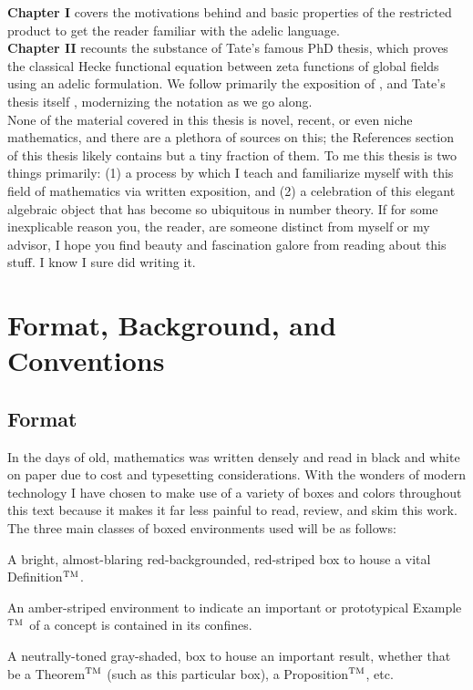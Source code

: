 \documentclass[11pt, x11names, openany]{book}
\begin{document}
\textbf{Chapter I} covers the motivations behind and basic properties of the restricted product to get the reader familiar with the adelic language.\\
\textbf{Chapter II} recounts the substance of Tate's famous PhD thesis, which proves the classical Hecke functional equation between zeta functions of global fields using an adelic formulation. We follow primarily the exposition of \cite{ramakrishnan1998fourier}, \cite{weil1974basic} and Tate's thesis itself \cite{TatesThesis}, modernizing the notation as we go along.\\

None of the material covered in this thesis is novel, recent, or even niche mathematics, and there are a plethora of sources on this; the References section of this thesis likely contains but a tiny fraction of them. To me this thesis is two things primarily: (1) a process by which I teach and familiarize myself with this field of mathematics via written exposition, and (2) a celebration of this elegant algebraic object that has become so ubiquitous in number theory. If for some inexplicable reason you, the reader, are someone distinct from myself or my advisor, I hope you find beauty and fascination galore from reading about this stuff. I know I sure did writing it.



\newpage

\section*{Format, Background, and Conventions}
\label{section: Format, Notation and Conventions}

\subsection*{Format}
In the days of old, mathematics was written densely and read in black and white on paper due to cost and typesetting considerations. With the wonders of modern technology I have chosen to make use of a variety of boxes and colors throughout this text because it makes it far less painful to read, review, and skim this work. The three main classes of boxed environments used will be as follows:
\begin{defn} 
    A bright, almost-blaring red-backgrounded, red-striped box to house a vital Definition$^{\textsc{TM}}$.
\end{defn}
\begin{example}
    An amber-striped environment to indicate an important or prototypical Example$^{\textsc{TM}}$ of a concept is contained in its confines.
\end{example}
\begin{theorem}
    A neutrally-toned gray-shaded, box to house an important result, whether that be a Theorem$^{\textsc{TM}}$ (such as this particular box), a Proposition$^{\textsc{TM}}$, etc.
\end{theorem}
\end{document}
